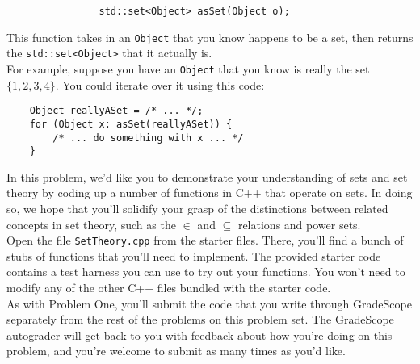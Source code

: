 \documentclass{article}
\renewcommand{\(}{\left(}
\renewcommand{\)}{\right)}
\theoremstyle{plain}
\theoremstyle{plain}
\theoremstyle{definition}
\begin{document}
\begin{verbatim}
				std::set<Object> asSet(Object o);
\end{verbatim}

This function takes in an \texttt{Object} that you know happens to be a set, then returns the \texttt{std::set<Object>} that it actually is. \\

For example, suppose you have an \texttt{Object} that you know is really the set $\{1, 2, 3, 4\}$. You could iterate over it using this code:

\begin{verbatim}
	Object reallyASet = /* ... */;
	for (Object x: asSet(reallyASet)) {
	    /* ... do something with x ... */
	}
\end{verbatim}

In this problem, we'd like you to demonstrate your understanding of sets and set theory by coding up a number of functions in C++ that operate on sets. In doing so, we hope that you'll solidify your grasp of the distinctions between related concepts in set theory, such as the $\in$ and $\subseteq$ relations and power sets. \\

Open the file \texttt{SetTheory.cpp} from the starter files. There, you'll find a bunch of stubs of functions that you'll need to implement. The provided starter code contains a test harness you can use to try out your functions. You won't need to modify any of the other C++ files bundled with the starter code. \\

As with Problem One, you'll submit the code that you write through GradeScope separately from the rest of the problems on this problem set. The GradeScope autograder will get back to you with feedback about how you're doing on this problem, and you're welcome to submit as many times as you'd like.
\end{document}
